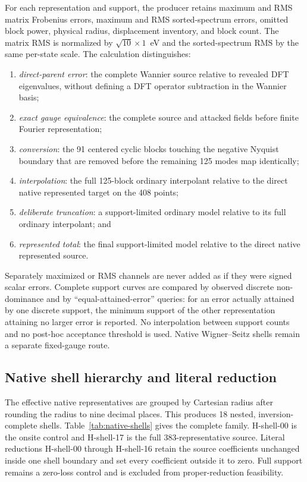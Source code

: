 \documentclass[11pt]{article}
\theoremstyle{definition}
\begin{document}
For each representation and support, the producer retains maximum and RMS matrix
Frobenius errors, maximum and RMS sorted-spectrum errors, omitted block power, physical
radius, displacement inventory, and block count.  The matrix RMS is normalized by
$\sqrt{10}\times1$~eV and the sorted-spectrum RMS by the same per-state scale.  The
calculation distinguishes:
\begin{enumerate}[leftmargin=2em]
 \item \emph{direct-parent error}: the complete Wannier source relative to revealed DFT
 eigenvalues, without defining a DFT operator subtraction in the Wannier basis;
 \item \emph{exact gauge equivalence}: the complete source and attacked fields before
 finite Fourier representation;
 \item \emph{conversion}: the 91 centered cyclic blocks touching the negative Nyquist
 boundary that are removed before the remaining 125 modes map identically;
 \item \emph{interpolation}: the full 125-block ordinary interpolant relative to the
 direct native represented target on the 408 points;
 \item \emph{deliberate truncation}: a support-limited ordinary model relative to its
 full ordinary interpolant; and
 \item \emph{represented total}: the final support-limited model relative to the direct
 native represented source.
\end{enumerate}
Separately maximized or RMS channels are never added as if they were signed scalar
errors.  Complete support curves are compared by observed discrete non-dominance and by
``equal-attained-error'' queries: for an error actually attained by one discrete support,
the minimum support of the other representation attaining no larger error is reported.
No interpolation between support counts and no post-hoc acceptance threshold is used.
Native Wigner--Seitz shells remain a separate fixed-gauge route.

\subsection{Native shell hierarchy and literal reduction}

The effective native representatives are grouped by Cartesian radius after rounding the
radius to nine decimal places.  This produces 18 nested, inversion-complete shells.
Table~\ref{tab:native-shells} gives the complete family.  H-shell-00 is the onsite
control and H-shell-17 is the full 383-representative source.  Literal reductions
H-shell-00 through H-shell-16 retain the source coefficients unchanged inside one shell
boundary and set every coefficient outside it to zero.  Full support remains a zero-loss
control and is excluded from proper-reduction feasibility.
\end{document}

